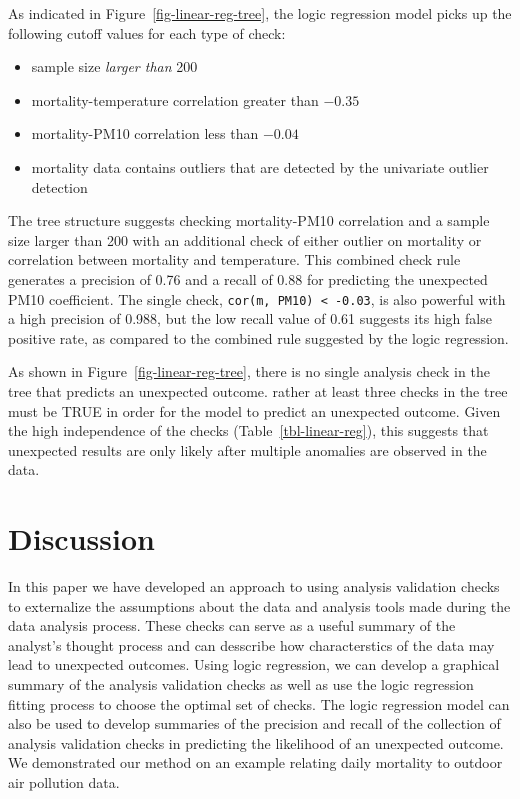 \documentclass[
  12pt,
]{interact}
\providecommand{\tightlist}{%
  \setlength{\itemsep}{0pt}\setlength{\parskip}{0pt}}\usepackage{longtable,booktabs,array}
\begin{document}
As indicated in Figure~\ref{fig-linear-reg-tree}, the logic regression
model picks up the following cutoff values for each type of check:

\begin{itemize}
\tightlist
\item
  sample size \emph{larger than} 200
\item
  mortality-temperature correlation greater than \(-0.35\)
\item
  mortality-PM10 correlation less than \(-0.04\)
\item
  mortality data contains outliers that are detected by the univariate
  outlier detection
\end{itemize}

The tree structure suggests checking mortality-PM10 correlation and a
sample size larger than 200 with an additional check of either outlier
on mortality or correlation between mortality and temperature. This
combined check rule generates a precision of 0.76 and a recall of 0.88
for predicting the unexpected PM10 coefficient. The single check,
\texttt{cor(m,\ PM10)\ \textless{}\ -0.03}, is also powerful with a high
precision of 0.988, but the low recall value of 0.61 suggests its high
false positive rate, as compared to the combined rule suggested by the
logic regression.

As shown in Figure~\ref{fig-linear-reg-tree}, there is no single
analysis check in the tree that predicts an unexpected outcome. rather
at least three checks in the tree must be TRUE in order for the model to
predict an unexpected outcome. Given the high independence of the checks
(Table~\ref{tbl-linear-reg}), this suggests that unexpected results are
only likely after multiple anomalies are observed in the data.

\section{Discussion}\label{sec-discussion}

In this paper we have developed an approach to using analysis validation
checks to externalize the assumptions about the data and analysis tools
made during the data analysis process. These checks can serve as a
useful summary of the analyst's thought process and can desscribe how
characterstics of the data may lead to unexpected outcomes. Using logic
regression, we can develop a graphical summary of the analysis
validation checks as well as use the logic regression fitting process to
choose the optimal set of checks. The logic regression model can also be
used to develop summaries of the precision and recall of the collection
of analysis validation checks in predicting the likelihood of an
unexpected outcome. We demonstrated our method on an example relating
daily mortality to outdoor air pollution data.
\end{document}
